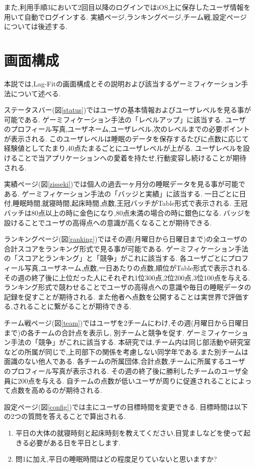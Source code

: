 また,利用手順3において2回目以降のログインではiOS上に保存したユーザ情報を用いて自動でログインする.
実績ページ,ランキングページ,チーム戦,設定ページについては後述する.

\section{画面構成}
本説では,Lag-Fitの画面構成とその説明および該当するゲーミフィケーション手法について述べる.

ステータスバー(図\ref{status})ではユーザの基本情報およびユーザレベルを見る事が可能である.
ゲーミフィケーション手法の「レベルアップ」に該当する.
ユーザのプロフィール写真,ユーザネーム,ユーザレベル,次のレベルまでの必要ポイントが表示される.
このユーザレベルは睡眠のデータを保存するたびに点数に応じて経験値としてたまり,40点たまるごとにユーザレベルが上がる.
ユーザレベルを設けることで当アプリケーションへの愛着を持たせ,行動変容し続けることが期待される.

実績ページ(図\ref{zisseki})では個人の過去一ヶ月分の睡眠データを見る事が可能である.
ゲーミフィケーション手法の「バッジと実績」に該当する.
一日ごとに日付,睡眠時間,就寝時間,起床時間,点数,王冠バッチがTable形式で表示される.
王冠バッチは80点以上の時に金色になり,80点未満の場合の時に銀色になる.
バッジを設けることでユーザの高得点への意識が高くなることが期待できる.

ランキングページ(図\ref{ranking})ではその週(月曜日から日曜日まで)の全ユーザの合計スコアをランキング形式で見る事が可能である.
ゲーミフィケーション手法の「スコアとランキング」と「競争」がこれに該当する.
各ユーザごとにプロフィール写真,ユーザネーム,点数,一日あたりの点数,順位がTable形式で表示される.
その週の終了後に上位だった人にそれぞれ1位300点,2位200点,3位100点を与える.
ランキング形式で競わせることでユーザの高得点への意識や毎日の睡眠データの記録を促すことが期待される.
また他者へ点数を公開することは実世界で評価する,されることに繋がることが期待できる.
 
チーム戦ページ(図\ref{team})ではユーザを2チームにわけ,その週(月曜日から日曜日まで)の各チームの合計点を表示し, 別チームと競争を促す.
ゲーミフィケーション手法の「競争」がこれに該当する.
本研究では,チーム内は同じ部活動や研究室などの所属が同じで,上司部下の関係を考慮しない同学年である.また別チームは面識のない他人である.
各チームの所属団体,合計点数,チームに所属するユーザのプロフィール写真が表示される. 
その週の終了後に勝利したチームのユーザ全員に200点を与える.
自チームの点数が低いユーザが周りに促進されることによって点数を高めるのが期待される.

設定ページ(図\ref{config})では主にユーザの目標時間を変更できる.
目標時間は以下の2つの質問を答えることで算出される.
\begin{enumerate}
\renewcommand{\labelenumi}{\arabic{enumi}.}
	\item 平日の大体の就寝時刻と起床時刻を教えてください.目覚ましなどを使って起きる必要がある日を平日とします.
	\item 問1に加え,平日の睡眠時間はどの程度足りていないと思いますか?
\end{enumerate}


